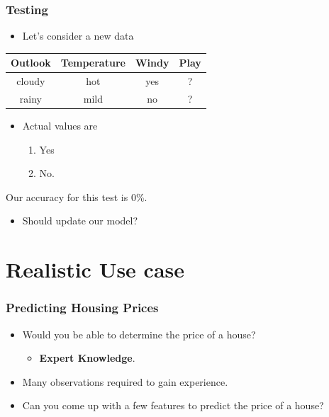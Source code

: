 \documentclass{beamer}
\begin{document}
\begin{frame}[t]
  \frametitle{Testing}
 \begin{itemize}
   \item Let's consider a \alert{new data}
 \end{itemize} 

\begin{center}
\begin{table}[]
  \centering
  \begin{tabular}{cccc}
    \toprule
    Outlook & Temperature & Windy & Play \\ 
    \midrule
    cloudy & hot & yes & \alert{?}\\
    rainy & mild & no & \alert{?}\\
    \bottomrule
  \end{tabular}
\end{table}
\end{center}
\pause
\begin{itemize}
  \item Actual values are
    \begin{enumerate}
      \item Yes
      \item No.
    \end{enumerate}
\end{itemize}

  \begin{tcolorbox}[myblock={Accuracy}]
    Our accuracy for this test is \alert{0\%}.
  \end{tcolorbox}
  \begin{itemize}
    \item Should update our model?
  \end{itemize}
\end{frame}

\section{Realistic Use case}%

\begin{frame}[t]
  \frametitle{Predicting Housing Prices}
  \begin{itemize}
    \item  Would you be able to determine the price of a \alert{house}?
      \begin{itemize}
        \item \textbf{Expert Knowledge}.
      \end{itemize}
      \pause
      \vspace*{1cm}
    \item \alert{Many observations} required to gain experience.\\\pause
      \vspace*{1cm}
    \item Can you come up with a \alert{few features} to predict the price of a house?
  \end{itemize}
  
\end{frame}
\end{document}
